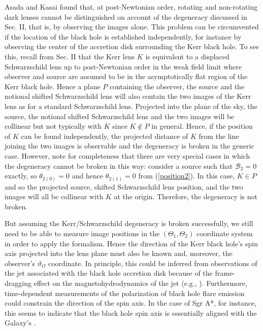 \documentclass[prd,12pt,a4paper,showpacs]{revtex4}
\def\xtn{\theta_{2(0)}}
\def\xto{\theta_{2(1)}}
\def\b{\mathcal{B}}
\def\bt{\b_2}
\def\t{\Theta}
\def\to{\t_1}
\def\tt{\t_2}
\begin{document}
Asada and Kasai \cite{asada} found that, at post-Newtonian order, 
rotating and non-rotating dark lenses 
cannot be distinguished on account of the degeneracy discussed in Sec. II, 
that is, by observing the images alone. 
This problem can be circumvented if the location of the black hole is 
established independently, for instance by 
observing the center of the accretion disk surrounding the Kerr black hole. 
To see this, recall from Sec. II that the 
Kerr lens $K$ is equivalent to a displaced Schwarzschild lens up to post-Newtonian 
order in the weak field limit 
where observer and source are assumed to be in the asymptotically flat region 
of the Kerr black hole. 
Hence a plane $P$ containing the observer, the source and the notional shifted 
Schwarzschild lens will also 
contain the two images of the Kerr lens as for a standard Schwarzschild lens. 
Projected into the plane of the sky, the 
source, the notional shifted Schwarzschild lens and the two images will be collinear 
but not typically with $K$ since $K\notin P$ in general. 
Hence, if the position of $K$ can be found independently, the projected distance of 
$K$ from the line joining the two 
images is observable and the degeneracy is broken in the generic case. 
However, note for completeness that there 
are very special cases in which the degeneracy cannot be broken in this way: 
consider a source such that $\bt=0$ exactly, 
so $\xtn=0$ and hence $\xto=0$ from (\ref{position2}). 
In this case, $K \in P$ and so the projected source, shifted Schwarzschild lens position, and the
two images will all be collinear with $K$ at the origin. Therefore, the degeneracy is not broken.

But assuming the Kerr/Schwarzschild degeneracy is broken successfully, 
we still need to be able to measure image positions 
in the $(\to,\tt)$ coordinate system in order to apply the formalism. 
Hence the direction of the Kerr black hole's 
spin axis projected into the lens plane must also be known and, 
moreover, the observer's $\vartheta_O$ coordinate. In principle, this 
could be inferred from observations of the jet associated with the black hole 
accretion disk because of the frame-dragging effect on the magnetohydrodynamics 
of the jet (e.g., \cite{narayan}). Furthermore, time-dependent measurements of the polarization 
of black hole flare emission could constrain the direction of the spin axis. In the case of Sgr A*, for 
instance, this seems to indicate that the black hole spin axis is essentially 
aligned with the Galaxy's \cite{trippe}.
\end{document}
